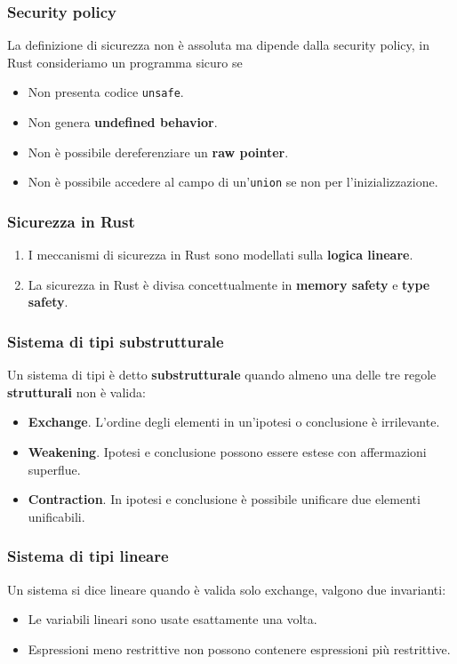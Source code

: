 \documentclass{beamer}
\newcommand{\textcode}[1]{\colorbox{backcolour}{\texttt{#1}}}
\begin{document}
\begin{frame}
    \frametitle{Security policy}
    La definizione di sicurezza non è assoluta ma dipende dalla security policy, in Rust consideriamo un programma sicuro se 
    \begin{itemize}
        \item Non presenta codice \textcode{unsafe}.
        \item Non genera \textbf{undefined behavior}.
        \item Non è possibile dereferenziare un \textbf{raw pointer}.
        \item Non è possibile accedere al campo di un'\textcode{union} se non per l'inizializzazione.
    \end{itemize}
\end{frame}

\begin{frame}
    \frametitle{Sicurezza in Rust}
    \begin{enumerate}
        \item I meccanismi di sicurezza in Rust sono modellati sulla \textbf{logica lineare}.
        \item La sicurezza in Rust è divisa concettualmente in  \textbf{memory safety} e \textbf{type safety}.
    \end{enumerate} 
\end{frame}

\begin{frame}
    \frametitle{Sistema di tipi substrutturale}
    Un sistema di tipi è detto \textbf{substrutturale} quando almeno una delle tre regole \textbf{strutturali} non è valida:
    \begin{itemize}
        \item \textbf{Exchange}. L'ordine degli elementi in un'ipotesi o conclusione è irrilevante. 
        \item \textbf{Weakening}. Ipotesi e conclusione possono essere estese con affermazioni superflue. 
        \item \textbf{Contraction}. In ipotesi e conclusione è possibile unificare due elementi unificabili. 
    \end{itemize} 
\end{frame}

\begin{frame}
    \frametitle{Sistema di tipi lineare}
    Un sistema si dice lineare quando è valida solo exchange, valgono due invarianti:
    \begin{itemize}
        \item Le variabili lineari sono usate esattamente una volta.
        \item Espressioni meno restrittive non possono contenere espressioni più restrittive.
    \end{itemize}
\end{frame}
\end{document}
